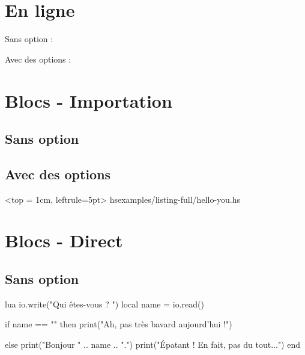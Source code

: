 \documentclass[theme = draft]{../main/main}
\begin{document}
\section{En ligne}

Sans option :




Avec des options :





\section{Blocs - Importation}

\subsection{Sans option}





\subsection{Avec des options}

\tdoccodeinput[style=solarized-light, linenos]%
              <top = 1cm, leftrule=5pt>%
              {hs}{examples/listing-full/hello-you.hs}



\section{Blocs - Direct}

\subsection{Sans option}

\begin{tdoccode}{lua}
io.write("Qui êtes-vous ? ")
local name = io.read()

if name == "" then
    print("Ah, pas très bavard aujourd'hui !")

else
    print("Bonjour " .. name .. ".")
    print("Épatant ! En fait, pas du tout...")
end
\end{tdoccode}
\end{document}
